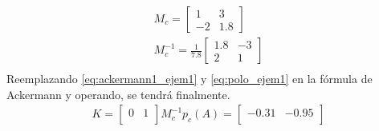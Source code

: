 \documentclass[12pt]{article}
\begin{document}
\begin{itemize}
\begin{equation}
\begin{split}
            M_{c}=
            \begin{bmatrix}
                1 & 3 \\
                -2 & 1.8
            \end{bmatrix}\\
            M^{-1}_{c}=\frac{1}{7.8}
            \begin{bmatrix}
                1.8 & -3 \\
                2 & 1
            \end{bmatrix}\\
        \end{split}
        \label{eq:ackermann1_ejem1}
    \end{equation}
    Reemplazando \ref{eq:ackermann1_ejem1} y \ref{eq:polo_ejem1} en la fórmula de Ackermann y operando, se tendrá finalmente.
    \begin{equation}
        \begin{split}
            K=
            \begin{bmatrix}
                0 & 1 \\
            \end{bmatrix}
            M^{-1}_{c}p_{c}(A)
            =
            \begin{bmatrix}
                -0.31 & -0.95 \\
            \end{bmatrix}
        \end{split}
        \label{eq:ackermann_ejem1_result}
    \end{equation}

\end{itemize}


\end{document}
